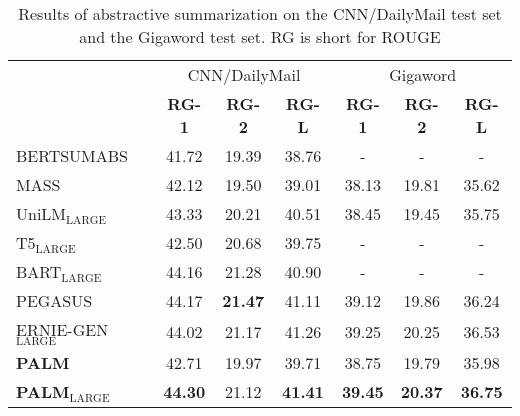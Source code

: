 \documentclass[11pt,a4paper]{article}
\newcommand{\method}{PALM\xspace}
\begin{document}
\begin{table*}[t]
\center
\begin{tabular}{ l c c c c c c}
\hline\hline
\textbf{} & \multicolumn{3}{c}{CNN/DailyMail} &  \multicolumn{3}{c}{Gigaword} \\

\textbf{} & \textbf{RG-1} & \textbf{RG-2} & \textbf{RG-L} 
& \textbf{RG-1} & \textbf{RG-2} & \textbf{RG-L}\\
\hline
BERTSUMABS \cite{liu-lapata-2019-text} & 41.72 & 19.39 & 38.76 & - & - & - \\

MASS \cite{mass2019song} & 42.12 & 19.50 & 39.01 & 38.13 & 19.81 & 35.62 \\

UniLM$_{\text{LARGE}}$ \cite{unilm2019} & 43.33 & 20.21 & 40.51 & 38.45 & 19.45 & 35.75  \\

T5$_{\text{LARGE}}$ \cite{raffel2019exploring} & 42.50 & 20.68 & 39.75 & - & - & - \\

BART$_{\text{LARGE}}$ \cite{bart2019} & 44.16 & 21.28 & 40.90 & - & - & - \\

PEGASUS \cite{pegasus} & 44.17 & \textbf{21.47} & 41.11 & 39.12 & 19.86 & 36.24  \\

ERNIE-GEN$_{\text{LARGE}}$ \cite{ernie-gen} & 44.02 & 21.17 & 41.26 & 39.25 & 20.25 & 36.53 \\

\hline

\textbf{\method} & 42.71 & 19.97 & 39.71 & 38.75 & 19.79 & 35.98 \\
\textbf{\method}$_{\text{LARGE}}$ & \textbf{44.30} & 21.12 & \textbf{41.41} & \textbf{39.45} & \textbf{20.37} & \textbf{36.75} \\
\hline\hline
\end{tabular}
\caption{Results of abstractive summarization on the CNN/DailyMail test set and the Gigaword test set. RG is short for ROUGE}
\label{table:gigaword}
\vspace{-10pt}
\end{table*}
\end{document}
